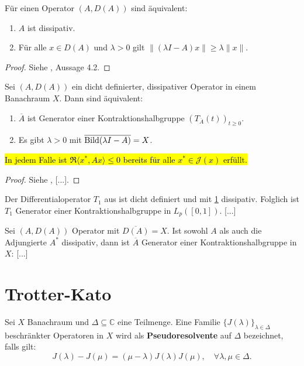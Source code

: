 \begin{prop}\label{Charakterisierung der Dissipativität}
Für einen Operator $(A, D(A))$ sind äquivalent:
\begin{enumerate}
\item $A$ ist dissipativ.
\item Für alle $x\in D(A)$ und $\lambda >0$ gilt $\|(\lambda I- A)x\|\geq \lambda \|x\|$.
\end{enumerate}
\end{prop} 

\begin{proof}
Siehe  \cite{pazy_1983}, Aussage 4.2.
\end{proof}

\begin{fsatz}
Sei $(A, D(A))$ ein dicht definierter, dissipativer Operator in einem Banachraum $X$. Dann sind äquivalent:
\begin{enumerate}
\item $\overline{A}$ ist Generator einer Kontraktionshalbgruppe $(T_{\overline{A}} (t))_{t\geq0}$.
\item Es gibt $\lambda>0$ mit $\overline{\textnormal{Bild}(\lambda I- A)}=X$.
\end{enumerate}
\hl{In jedem Falle ist $\mathfrak R\langle x^*, Ax\rangle\leq 0$ bereits für alle $x^*\in\mathcal J(x)$ erfüllt.}
\end{fsatz}

\begin{proof}
Siehe \cite{engel_nagel_2006}, [...].
\end{proof}

\begin{bsp}
Der Differentialoperator $T_1$ aus \Cref{} ist dicht definiert und mit \ref{} dissipativ. Folglich ist $T_1$ Generator einer Kontraktionshalbgruppe in $L_p([0,1])$. [...]
\end{bsp}

\begin{bsp}
Sei $(A, D(A))$ Operator mit $\overline{D(A)}=X$. Ist sowohl $A$ als auch die Adjungierte $A^*$ dissipativ, dann ist $\overline A$ Generator einer Kontraktionshalbgruppe in $X$: [...]
\end{bsp}

\section{Trotter-Kato} %


\begin{defi}
Sei $X$ Banachraum und $\Delta\subseteq\mathbb C$ eine Teilmenge. Eine Familie $\{J(\lambda)\}_{\lambda\in\Delta}$ beschränkter Operatoren in $X$ wird als \textbf{Pseudoresolvente} auf $\Delta$ bezeichnet, falls gilt:
\begin{equation*}
J(\lambda)-J(\mu)=(\mu-\lambda)J(\lambda)J(\mu),\quad\forall\lambda,\mu\in\Delta.
\end{equation*}
\end{defi}

